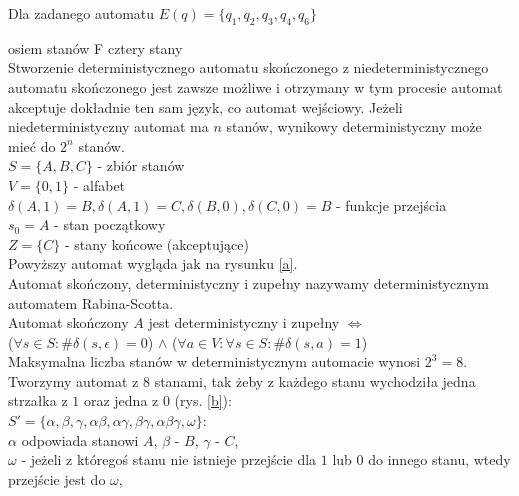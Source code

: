 Dla zadanego automatu $E(q) = \{q_1, q_2, q_3, q_4, q_6\}$


{osiem stanów}
{F}
{cztery stany}
{\\
	Stworzenie deterministycznego automatu skończonego z niedeterministycznego automatu skończonego jest zawsze możliwe i otrzymany w tym procesie automat akceptuje dokładnie ten sam język, co automat wejściowy. Jeżeli niedeterministyczny automat ma $n$ stanów, wynikowy deterministyczny może mieć do $2^n$ stanów.\\
	\newline
	$S = \{A,B,C\}$ - zbiór stanów\\
	$V = \{0,1\}$ - alfabet\\
	$\delta(A,1) = B, \delta(A,1) = C, \delta(B,0), \delta(C,0) = B$ - funkcje przejścia\\
	$s_0 = A$ - stan początkowy\\
	$Z = \{C\}$ - stany końcowe (akceptujące)\\
	Powyższy automat wygląda jak na rysunku \ref{a}.\\
	\newline
	Automat skończony, deterministyczny i zupełny nazywamy deterministycznym automatem Rabina-Scotta.\\
	Automat skończony $A$ jest deterministyczny i zupełny $\Leftrightarrow$\\($\forall s\in S: \#\delta(s,\epsilon) = 0$) $\wedge$ ($\forall a \in V: \forall s \in S: \#\delta(s,a) = 1$)\\
	\newline
	Maksymalna liczba stanów w deterministycznym automacie wynosi $2^3 = 8$.\\
	Tworzymy automat z $8$ stanami, tak żeby z każdego stanu wychodziła jedna strzałka z $1$ oraz jedna z $0$ (rys. \ref{b}):\\
	$S' = \{\alpha, \beta, \gamma, \alpha\beta, \alpha\gamma, \beta\gamma, \alpha\beta\gamma, \omega\}$:\\
	$\alpha$ odpowiada stanowi $A$, $\beta$ - $B$, $\gamma$ - $C$,\\ 
	$\omega$ - jeżeli z któregoś stanu nie istnieje przejście dla $1$ lub $0$ do innego stanu, wtedy przejście jest do $\omega$,\\ 
}
